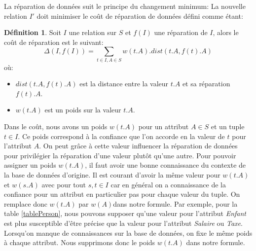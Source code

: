 \documentclass[letterpaper, 12pt]{report}
\theoremstyle{definition}
\newtheorem{mydef}{Définition}
\begin{document}

La réparation de données suit le principe du changement minimum: La nouvelle relation $I'$ doit minimiser le coût de réparation de données défini comme étant:

\begin{mydef}
 Soit $I$ une relation sur $S$ et $f(I)$ une réparation de $I$, alors le coût de réparation est le suivant:
 $$ \Delta(I,f(I)) = \sum_{t \in I, A \in S} w(t.A).dist(t.A,f(t).A) $$
 où:
 \begin{itemize}
 	\item $dist(t.A,f(t).A)$ est la distance entre la valeur $t.A$ et sa réparation $f(t).A$.
 	\item $w(t.A)$ est un poids sur la valeur $t.A$.
 \end{itemize}
\end{mydef}

Dans le coût, nous avons un poids $w(t.A)$ pour un attribut $A \in S$ et un tuple $t \in I$. Ce poids correspond à la confiance que l'on accorde en la valeur de $t$ pour l'attribut $A$. On peut grâce à cette valeur influencer la réparation de données pour privilégier la réparation d'une valeur plutôt qu'une autre. Pour pouvoir assigner un poids $w(t.A)$, il faut avoir une bonne connaissance du contexte de la base de données d'origine. Il est courant d'avoir la même valeur pour $w(t.A)$ et $w(s.A)$ avec pour tout $s,t \in I$ car en général on a connaissance de la confiance pour un attribut en particulier pas pour chaque valeur du tuple. On remplace donc $w(t.A)$ par $w(A)$dans notre formule. Par exemple, pour la table \ref{tablePerson}, nous pouvons supposer qu'une valeur pour l'attribut \emph{Enfant} est plus susceptible d'être précise que la valeur pour l'attribut \emph{Salaire} ou \emph{Taxe}. Lorsqu'on manque de connaissances sur la base de données, on fixe le même poids à chaque attribut. Nous supprimons donc le poids $w(t.A)$ dans notre formule.\\
\end{document}
